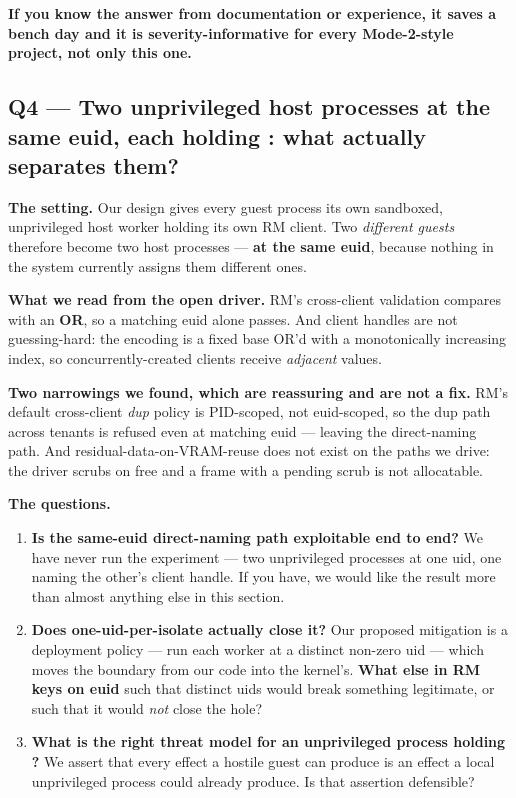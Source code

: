 \documentclass[10.5pt]{article}
\begin{document}
\textbf{If you know the answer from documentation or experience, it saves a bench day and it is
severity-informative for every Mode-2-style project, not only this one.}

\subsection*{Q4 --- Two unprivileged host processes at the same euid, each holding : what actually separates them?}

\textbf{The setting.} Our design gives every guest process its own sandboxed, unprivileged host
worker holding its own RM client. Two \emph{different guests} therefore become two host processes
— \textbf{at the same euid}, because nothing in the system currently assigns them different ones.

\textbf{What we read from the open driver.} RM's cross-client validation compares
 with an \textbf{OR}, so a matching euid alone passes. And client handles are
not guessing-hard: the encoding is a fixed base OR'd with a monotonically increasing index, so
concurrently-created clients receive \emph{adjacent} values.

\textbf{Two narrowings we found, which are reassuring and are not a fix.} RM's default
cross-client \emph{dup} policy is PID-scoped, not euid-scoped, so the dup path across tenants is
refused even at matching euid — leaving the direct-naming path. And residual-data-on-VRAM-reuse
does not exist on the paths we drive: the driver scrubs on free and a frame with a pending scrub
is not allocatable.

\textbf{The questions.}
\begin{enumerate}[itemsep=0.3ex]
\item \textbf{Is the same-euid direct-naming path exploitable end to end?} We have never run the
  experiment — two unprivileged processes at one uid, one naming the other's client handle. If you
  have, we would like the result more than almost anything else in this section.
\item \textbf{Does one-uid-per-isolate actually close it?} Our proposed mitigation is a deployment
  policy — run each worker at a distinct non-zero uid — which moves the boundary from our code
  into the kernel's. \textbf{What else in RM keys on euid} such that distinct uids would break
  something legitimate, or such that it would \emph{not} close the hole?
\item \textbf{What is the right threat model for an unprivileged process holding
  ?} We assert that every effect a hostile guest can produce is an effect a
  local unprivileged process could already produce. Is that assertion defensible?
\end{enumerate}
\end{document}
